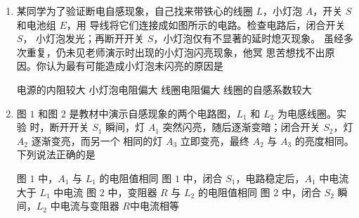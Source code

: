 
\begin{enumerate}
\item
{}
某同学为了验证断电自感现象，自己找来带铁心的线圈 $ L $，小灯泡 $ A $，开关 $ S $ 和电池组 $ E $，用
导线将它们连接成如图所示的电路。检查电路后，闭合开关 $ S $，
小灯泡发光；再断开开关 $ S $，小灯泡仅有不显著的延时熄灭现象。
虽经多次重复，仍未见老师演示时出现的小灯泡闪亮现象，他冥
思苦想找不出原因。你认为最有可能造成小灯泡未闪亮的原因是  
\begin{figure}[h!]
\centering

\end{figure}

\fourchoices
{电源的内阻较大}
{小灯泡电阻偏大}
{线圈电阻偏大}
{线圈的自感系数较大}


\item 
{}
图 $ 1 $ 和图 $ 2 $ 是教材中演示自感现象的两个电路图，$ L_{1} $ 和 $ L_{2} $ 为电感线圈。实验
时，断开开关 $ S_{1} $ 瞬间，灯 $ A_{1} $ 突然闪亮，随后逐渐变暗；闭合开关 $ S_{2} $，灯 $ A_{2} $ 逐渐变亮，而另一个
相同的灯 $ A_{3} $ 立即变亮，最终 $ A_{2} $ 与 $ A_{3} $ 的亮度相同。下列说法正确的是  
\begin{figure}[h!]
\centering
\begin{subfigure}{0.4\linewidth}
\centering
 
\caption{}\label{}
\end{subfigure}
\begin{subfigure}{0.4\linewidth}
\centering
 
\caption{}\label{}
\end{subfigure}
\end{figure}

\fourchoices
{图 $ 1 $ 中，$ A_{1} $ 与 $ L_{1} $ 的电阻值相同}
{图 $ 1 $ 中，闭合 $ S_{1} $，电路稳定后，$ A_{1} $ 中电流大于 $ L_{1} $ 中电流}
{图 $ 2 $ 中，变阻器 $ R $ 与 $ L_{2} $ 的电阻值相同}
{图 $ 2 $ 中，闭合 $ S_{2} $ 瞬间，$ L_{2} $ 中电流与变阻器 $ R $中电流相等}








\end{enumerate}

